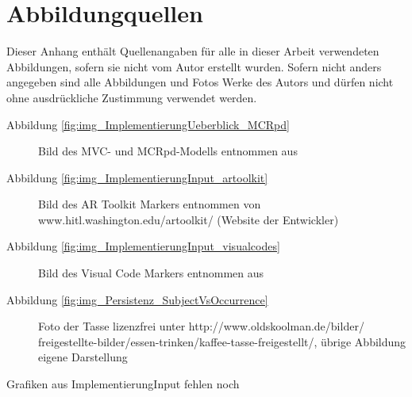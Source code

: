 \chapter*{Abbildungquellen}

Dieser Anhang enthält Quellenangaben für alle in dieser Arbeit verwendeten Abbildungen, sofern sie nicht vom Autor erstellt wurden. Sofern nicht anders angegeben sind alle Abbildungen und Fotos Werke des Autors und dürfen nicht ohne ausdrückliche Zustimmung verwendet werden.

\begin{description}
 \item[Abbildung \ref{fig:img_ImplementierungUeberblick_MCRpd}] Bild des MVC- und MCRpd-Modells entnommen aus \citep{Ullmer00}
 \end{description}

\begin{description}
 \item[Abbildung \ref{fig:img_ImplementierungInput_artoolkit}] Bild des AR Toolkit Markers entnommen von www.hitl.washington.edu/artoolkit/ (Website der Entwickler)
 \end{description}

\begin{description}
 \item[Abbildung \ref{fig:img_ImplementierungInput_visualcodes}] Bild des Visual Code Markers entnommen aus \citep{Rohs04}
 \end{description}

\begin{description}
 \item[Abbildung \ref{fig:img_Persistenz_SubjectVsOccurrence}] Foto der Tasse lizenzfrei unter http://www.oldskoolman.de/bilder/\\freigestellte-bilder/essen-trinken/kaffee-tasse-freigestellt/, übrige Abbildung eigene Darstellung
 \end{description}

Grafiken aus ImplementierungInput fehlen noch